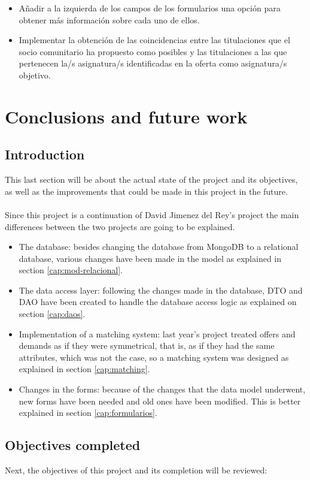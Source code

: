 \documentclass[11pt]{book}
\begin{document}
\begin{itemize}
	    \item Añadir a la izquierda de los campos de los formularios una opción para obtener más información sobre cada uno de ellos.
	    \item Implementar la obtención de las coincidencias entre las titulaciones que el socio comunitario ha propuesto como posibles y las titulaciones a las que pertenecen la/s asignatura/s identificadas en la oferta como asignatura/s objetivo.
	\end{itemize}
	
	
	\chapter{Conclusions and future work}
	\section{Introduction}
	This last section will be about the actual state of the project and its objectives, as well as the improvements that could be made in this project in the future.\\\\
	Since this project is a continuation of David Jimenez del Rey's project the main differences between the two projects are going to be explained.
	\begin{itemize}
		\item The database: besides changing the database from MongoDB to a relational database, various changes have been made in the model as explained in section \ref{cap:mod-relacional}.
		\item The data access layer: following the changes made in the database, DTO and DAO have been created to handle the database access logic as explained on section \ref{cap:daos}.
		\item Implementation of a matching system: last year's project treated offers and demands as if they were symmetrical, that is, as if they had the same attributes, which was not the case, so a matching system was designed as explained in section \ref{cap:matching}.
		\item Changes in the forms: because of the changes that the data model underwent, new forms have been needed and old ones have been modified. This is better explained in section \ref{cap:formularios}.
	\end{itemize}
	
	\section{Objectives completed}
	Next, the objectives of this project and its completion will be reviewed:
	
\end{document}
